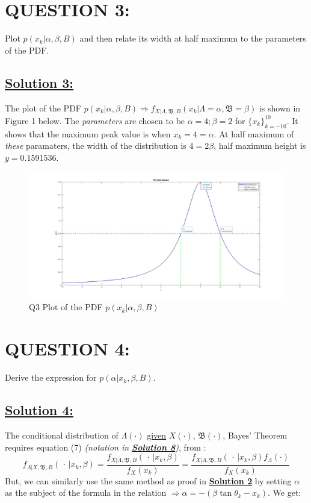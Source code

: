 \documentclass[a4paper,11pt]{article}
\begin{document}
\section{QUESTION 3:}
Plot $p(x_k | \alpha, \beta, B)$ and then relate its width at half maximum to the parameters of the PDF.

\subsection*{\underline{Solution 3:}}
The plot of the PDF $ p(x_k | \alpha, \beta, B) \Rightarrow f_{X | \Lambda, \mathfrak{B}, B}(x_k |\Lambda = \alpha, \mathfrak{B} = \beta)$ is shown in Figure 1 below. The \emph{parameters} are chosen to be $\alpha = 4; \beta = 2$ for $\{x_k \}^ {10} _{k = -10}$. It shows that the maximum peak value is when $x_k = 4 = \alpha$. At half maximum of \emph{these} paramaters, the width of the distribution is $4 = 2 \beta$, half maximum height is $y = 0.1591536$.

\begin{figure}[h]
        \centering
        \includegraphics[scale=0.16]{q03pdfplot.jpg} 
        \caption{Q3 Plot of the PDF $p(x_k | \alpha, \beta, B)$}
\end{figure}


\section{QUESTION 4:}
Derive the expression for $p(\alpha | x_k, \beta, B)$.

\subsection*{\underline{Solution 4:}}
The conditional distribution of $\Lambda(\cdot)$ \underline{given} $X(\cdot), \, \mathfrak{B}(\cdot)$, Bayes' Theorem requires equation (7) \emph{(notation in \hyperref[sec:notation]{\textbf{Solution 8}})}, from \cite{stanford_lecture20}:
\begin{equation}
	f_{\Lambda | X, \mathfrak{B},B} (\, \cdot \, | x_k, \beta) = \frac{f_{X | \Lambda, \mathfrak{B},B}(\, \cdot \, | x_k, \beta)}{f_X(x_k)} =
	\frac{f_{X | \Lambda, \mathfrak{B},B}(\, \cdot \, | x_k, \beta) f_\Lambda(\cdot)}{f_X(x_k)}
\end{equation}
But, we can similarly use the same method as proof in \hyperref[sec:proof]{\textbf{Solution 2}} by setting $\alpha$ as the subject of the formula in the relation $\Rightarrow \alpha = -(\beta \tan \theta_k - x_k)$. We get:
\end{document}
